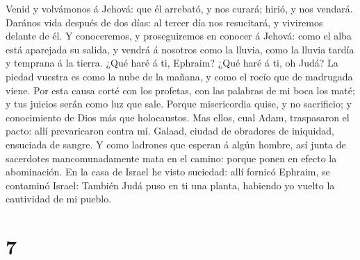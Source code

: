 Venid y volvámonos á Jehová: que él arrebató, y nos curará;
hirió, y nos vendará.  Darános vida después de dos días: al
tercer día nos resucitará, y viviremos delante de él.  Y
conoceremos, y proseguiremos en conocer á Jehová: como el alba está
aparejada su salida, y vendrá á nosotros como la lluvia, como la lluvia
tardía y temprana á la tierra.  ¿Qué haré á ti, Ephraim?
¿Qué haré á ti, oh Judá? La piedad vuestra es como la nube de la mañana,
y como el rocío que de madrugada viene.  Por esta causa
corté con los profetas, con las palabras de mi boca los maté; y tus
juicios serán como luz que sale.  Porque misericordia quise,
y no sacrificio; y conocimiento de Dios más que holocaustos.
 Mas ellos, cual Adam, traspasaron el pacto: allí
prevaricaron contra mí.  Galaad, ciudad de obradores de
iniquidad, ensuciada de sangre.  Y como ladrones que esperan
á algún hombre, así junta de sacerdotes mancomunadamente mata en el
camino: porque ponen en efecto la abominación.  En la casa
de Israel he visto suciedad: allí fornicó Ephraim, se contaminó Israel:
 También Judá puso en ti una planta, habiendo yo vuelto la
cautividad de mi pueblo.

\hypertarget{section-6}{%
\section{7}\label{section-6}}

